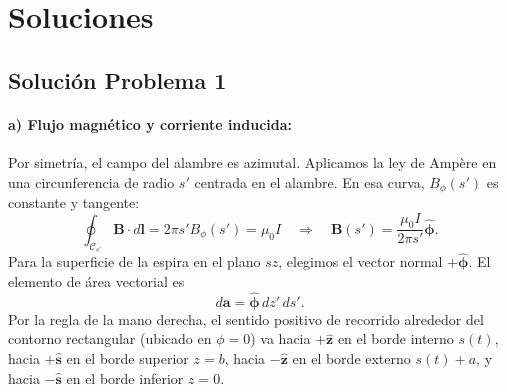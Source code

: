 \documentclass[11pt]{article}
\begin{document}
\newpage

\section*{Soluciones}

\subsection*{Solución Problema 1}

\paragraph{a) Flujo magnético y corriente inducida:}
Por simetría, el campo del alambre es azimutal. Aplicamos
la ley de Ampère en una circunferencia de radio $s'$ centrada en
el alambre. En esa curva, $B_\phi(s')$ es constante y tangente:
\[
    \oint_{\mathcal C_{s'}}\mathbf B\cdot d\mathbf l
    =2\pi s'B_\phi(s')=\mu_0 I
    \quad\Longrightarrow\quad
    \mathbf B(s')=\frac{\mu_0 I}{2\pi s'}\hat{\boldsymbol\phi}.
\]
Para la superficie de la espira en el plano $sz$, elegimos el
vector normal $+\hat{\boldsymbol{\phi}}$. El elemento de área
vectorial es
\begin{equation}
    d\mathbf a = \hat{\boldsymbol{\phi}}\,dz'\,ds'.
    \label{ind:area-espira}
\end{equation}
Por la regla de la mano derecha, el sentido positivo de recorrido alrededor del contorno rectangular (ubicado en $\phi = 0$) va hacia $+\hat{\mathbf{z}}$ en el borde interno $s(t)$, hacia $+\hat{\mathbf{s}}$ en el borde superior $z=b$, hacia $-\hat{\mathbf{z}}$ en el borde externo $s(t)+a$, y hacia $-\hat{\mathbf{s}}$ en el borde inferior $z=0$.
\end{document}
